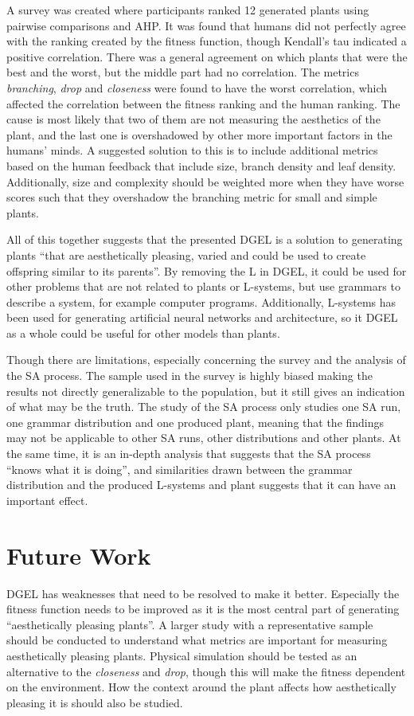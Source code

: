 A survey was created where participants ranked 12 generated plants using pairwise comparisons and AHP.
It was found that humans did not perfectly agree with the ranking created by the fitness function, though Kendall's tau indicated a positive correlation.
There was a general agreement on which plants that were the best and the worst, but the middle part had no correlation.
The metrics \textit{branching}, \textit{drop} and \textit{closeness} were found to have the worst correlation, which affected the correlation between the fitness ranking and the human ranking.
The cause is most likely that two of them are not measuring the aesthetics of the plant, and the last one is overshadowed by other more important factors in the humans' minds.
A suggested solution to this is to include additional metrics based on the human feedback that include size, branch density and leaf density.
Additionally, size and complexity should be weighted more when they have worse scores such that they overshadow the branching metric for small and simple plants.

All of this together suggests that the presented \gls{DGEL} is a solution to generating plants ``that are aesthetically pleasing, varied and could be used to create offspring similar to its parents''.
By removing the L in \gls{DGEL}, it could be used for other problems that are not related to plants or \glspl{L-system}, but use grammars to describe a system, for example computer programs.
Additionally, \glspl{L-system} has been used for generating artificial neural networks and architecture, so it \gls{DGEL} as a whole could be useful for other models than plants.

Though there are limitations, especially concerning the survey and the analysis of the \gls{SA} process.
The sample used in the survey is highly biased making the results not directly generalizable to the population, but it still gives an indication of what may be the truth.
The study of the \gls{SA} process only studies one \gls{SA} run, one grammar distribution and one produced plant, meaning that the findings may not be applicable to other \gls{SA} runs, other distributions and other plants.
At the same time, it is an in-depth analysis that suggests that the \gls{SA} process ``knows what it is doing'', and similarities drawn between the grammar distribution and the produced \glspl{L-system} and plant suggests that it can have an important effect.

\section{Future Work}
\gls{DGEL} has weaknesses that need to be resolved to make it better.
Especially the fitness function needs to be improved as it is the most central part of generating ``aesthetically pleasing plants''.
A larger study with a representative sample should be conducted to understand what metrics are important for measuring aesthetically pleasing plants.
Physical simulation should be tested as an alternative to the \textit{closeness} and \textit{drop}, though this will make the fitness dependent on the environment.
How the context around the plant affects how aesthetically pleasing it is should also be studied.

